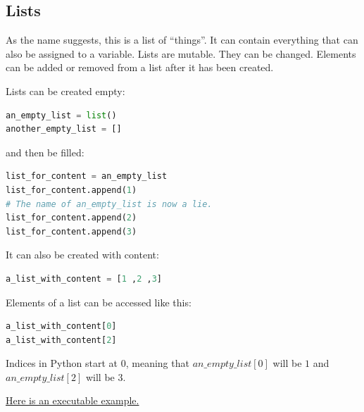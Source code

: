\documentclass{article}
\begin{document}
\subsection{Lists}\label{lists}

As the name suggests, this is a list of ``things''.
It can contain everything that can also be assigned to a variable.
Lists are mutable. They can be changed.
Elements can be added or removed from a list after it has been created.

Lists can be created empty:

\begin{lstlisting}[language=Python]
an_empty_list = list()
another_empty_list = []
\end{lstlisting}

and then be filled:

\begin{lstlisting}[language=Python]
list_for_content = an_empty_list
list_for_content.append(1)
# The name of an_empty_list is now a lie.
list_for_content.append(2)
list_for_content.append(3)
\end{lstlisting}

It can also be created with content:

\begin{lstlisting}[language=Python]
a_list_with_content = [1 ,2 ,3]
\end{lstlisting}

Elements of a list can be accessed like this:

\begin{lstlisting}[language=Python]
a_list_with_content[0]
a_list_with_content[2]
\end{lstlisting}

Indices in Python start at 0, meaning that
$an\_empty\_list[0]$ will be $1$ and $an\_empty\_list[2]$
will be 3.

\href{http://pythontutor.com/visualize.html\#code=an\_empty\_list\%20\%3D\%20list\%28\%29\%0Aanother\_empty\_list\%20\%3D\%20\%5B\%5D\%0A\%0Alist\_for\_content\%20\%3D\%20an\_empty\_list\%0Alist\_for\_content.append\%281\%29\%0A\%23\%20The\%20name\%20of\%20an\_empty\_list\%20is\%20now\%20a\%20lie.\%0Alist\_for\_content.append\%282\%29\%0Alist\_for\_content.append\%283\%29\%0A\%0Aa\_list\_with\_content\%20\%3D\%20\%5B1\%20,2\%20,3\%5D\%0A\%0Aprint\%28an\_empty\_list\%29\%0Aprint\%28another\_empty\_list\%29\%0Aprint\%28list\_for\_content\%29\%0Aprint\%28a\_list\_with\_content\%29\%0A\%0Aprint\%28an\_empty\_list\%5B0\%5D\%29\%0Aprint\%28an\_empty\_list\%5B2\%5D\%29\&cumulative=false\&curInstr=13\&heapPrimitives=nevernest\&mode=display\&origin=opt-frontend.js\&py=3\&rawInputLstJSON=\%5B\%5D\&textReferences=false }
{Here is an executable example.}
\end{document}
